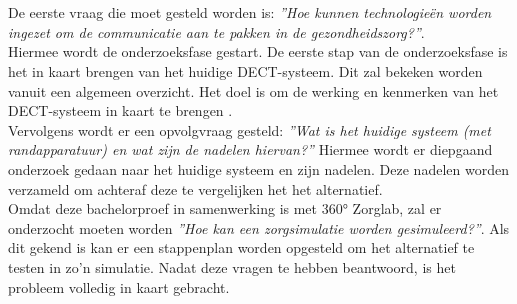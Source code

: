 \section{}%
\label{sec:prep}%
De eerste vraag die moet gesteld worden is: \textit{''Hoe kunnen technologieën worden ingezet om de communicatie aan te pakken in de gezondheidszorg?''}.\\ 

Hiermee wordt de onderzoeksfase gestart. De eerste stap van de onderzoeksfase is het in kaart brengen van het huidige DECT-systeem. Dit zal bekeken worden vanuit een algemeen overzicht. Het doel is om de werking en kenmerken van het DECT-systeem in kaart te brengen .\\
Vervolgens wordt er een opvolgvraag gesteld: \textit{''Wat is het huidige systeem (met randapparatuur) en wat zijn de nadelen hiervan?''} Hiermee wordt er diepgaand onderzoek gedaan naar het huidige systeem en zijn nadelen. Deze nadelen worden verzameld om achteraf deze te vergelijken het het alternatief.\\ Omdat deze bachelorproef in samenwerking is met 360° Zorglab, zal er onderzocht moeten worden \textit{''Hoe kan een zorgsimulatie worden gesimuleerd?''}. Als dit gekend is kan er een stappenplan worden opgesteld om het alternatief te testen in zo'n simulatie.
Nadat deze vragen te hebben beantwoord, is het probleem volledig in kaart gebracht.\\



